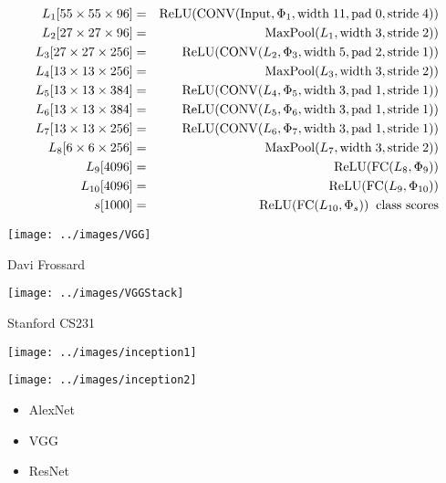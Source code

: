 {{\begin{eqnarray*}
L_1[55 \times 55 \times 96] & = & \mathrm{ReLU}(\mathrm{CONV}(\mathrm{Input},\Phi_1,\mathrm{width}\;11,\mathrm{pad}\;0,\mathrm{stride}\;4)) \\
L_2[27 \times 27 \times 96] & = & \mathrm{MaxPool}(L_1,\mathrm{width}\;3,\mathrm{stride}\;2))  \\
L_3[27 \times 27 \times 256] & = & \mathrm{ReLU}(\mathrm{CONV}(L_2,\Phi_3,\mathrm{width}\;5,\mathrm{pad}\;2,\mathrm{stride}\;1))  \\
L_4[13 \times 13 \times 256] & = & \mathrm{MaxPool}(L_3,\mathrm{width}\;3,\mathrm{stride}\;2))  \\
L_5[13 \times 13 \times 384] & = & \mathrm{ReLU}(\mathrm{CONV}(L_4,\Phi_5,\mathrm{width}\;3,\mathrm{pad}\;1,\mathrm{stride}\;1))  \\
L_6[13 \times 13 \times 384] & = & \mathrm{ReLU}(\mathrm{CONV}(L_5,\Phi_6,\mathrm{width}\;3,\mathrm{pad}\;1,\mathrm{stride}\;1))  \\
L_7[13 \times 13 \times 256] & = & \mathrm{ReLU}(\mathrm{CONV}(L_6,\Phi_7,\mathrm{width}\;3,\mathrm{pad}\;1,\mathrm{stride}\;1))  \\
L_8[6 \times 6 \times 256] & = & \mathrm{MaxPool}(L_7,\mathrm{width}\;3,\mathrm{stride}\;2)) \\
L_9[4096] & = & \mathrm{ReLU}(\mathrm{FC}(L_8,\Phi_9)) \\
L_{10}[4096] & = & \mathrm{ReLU}(\mathrm{FC}(L_9,\Phi_{10})) \\
s[1000] & = & \mathrm{ReLU}(\mathrm{FC}(L_{10},\Phi_s)) \;\;\mbox{class scores}
\end{eqnarray*}
}


\centerline{\texttt{[image: ../images/VGG]}}
\centerline{\large Davi Frossard}

\centerline{\texttt{[image: ../images/VGGStack]}}
\centerline{\large Stanford CS231}


\centerline{\texttt{[image: ../images/inception1]}}
\vfill
\centerline{\texttt{[image: ../images/inception2]}}



{\Large
\begin{itemize}

\item AlexNet

\item VGG

\item ResNet


\end{itemize}}}
